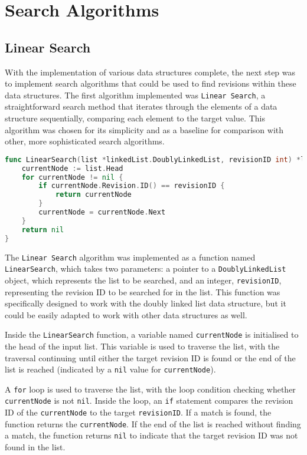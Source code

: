 \section{Search Algorithms}

\subsection{Linear Search}
With the implementation of various data structures complete, the next step was to implement search algorithms that could be used to find revisions within these data structures. The first algorithm implemented was \lstinline{Linear Search}, a straightforward search method that iterates through the elements of a data structure sequentially, comparing each element to the target value. This algorithm was chosen for its simplicity and as a baseline for comparison with other, more sophisticated search algorithms.

\begin{lstlisting}[language=go]
func LinearSearch(list *linkedList.DoublyLinkedList, revisionID int) *linkedList.DLLNode {
	currentNode := list.Head
	for currentNode != nil {
		if currentNode.Revision.ID() == revisionID {
			return currentNode
		}
		currentNode = currentNode.Next
	}
	return nil
}
\end{lstlisting}
\medskip

The \lstinline{Linear Search} algorithm was implemented as a function named \lstinline{LinearSearch}, which takes two parameters: a pointer to a \lstinline{DoublyLinkedList} object, which represents the list to be searched, and an integer, \lstinline{revisionID}, representing the revision ID to be searched for in the list. This function was specifically designed to work with the doubly linked list data structure, but it could be easily adapted to work with other data structures as well.
\smallskip

Inside the \lstinline{LinearSearch} function, a variable named \lstinline{currentNode} is initialised to the head of the input list. This variable is used to traverse the list, with the traversal continuing until either the target revision ID is found or the end of the list is reached (indicated by a \lstinline{nil} value for \lstinline{currentNode}).
\smallskip

A \lstinline{for} loop is used to traverse the list, with the loop condition checking whether \lstinline{currentNode} is not \lstinline{nil}. Inside the loop, an \lstinline{if} statement compares the revision ID of the \lstinline{currentNode} to the target \lstinline{revisionID}. If a match is found, the function returns the \lstinline{currentNode}. If the end of the list is reached without finding a match, the function returns \lstinline{nil} to indicate that the target revision ID was not found in the list.

